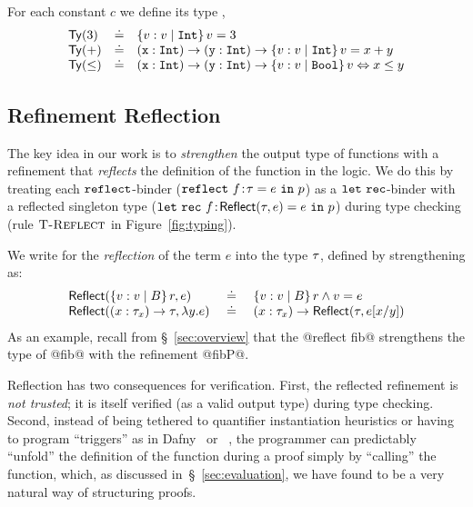 For each constant $c$ we define its type , \eg%
%
$$
\begin{array}{lcl}
\constty{3} &\doteq& \tref{v}{\tint}{v = 3}\\
\constty{+} &\doteq& \tfun{\ttx}{\tint}{\tfun{\tty}{\tint}{\tref{v}{\tint}{v = x + y}}}\\
\constty{\leq} &\doteq& \tfun{\ttx}{\tint}{\tfun{\tty}{\tint}{\tref{v}{\tbool}{v \Leftrightarrow x \leq y}}}\\
\end{array}
$$
%

\subsection{Refinement Reflection}\label{subsec:logicalannotations}
%
The key idea in our work is to
\emph{strengthen} the output type of functions
with a refinement that \emph{reflects} the
definition of the function in the logic.
%
We do this by treating each
%
$\erefname$-binder
%
(${\erefb{f}{\gtyp}{e}{\prog}}$)
%
as a $\eletname$-binder with a reflected singleton type
%
(${\eletb{f}{\exacttype{\gtyp}{e}}{e}{\prog}}$)
%
during type checking (rule $\rtreflect$ in Figure~\ref{fig:typing}).

%
We write  for the \emph{reflection}
of the term $e$ into the type $\typ$,  defined by strengthening
\typ as:
%
$$
\begin{array}{lcl}
\exacttype{\tref{v}{\btyp}{r}}{e}
  & \defeq
  & \tref{v}{\btyp}{r \land v = e}\\
\exacttype{\tfun{x}{\typ_x}{\typ}}{\efun{y}{}{e}}
  & \defeq
  & \tfun{x}{\typ_x}{\exacttype{\typ}{e\subst{y}{x}}}
\end{array}
$$
%
As an example, recall from \S~\ref{sec:overview}
that the @reflect fib@ strengthens the type of
@fib@ with the refinement @fibP@.


%
Reflection has two consequences for verification.
%
First, the reflected refinement is \emph{not trusted};
it is itself verified (as a valid output type)
during type checking.
%
Second, instead of being tethered to quantifier
instantiation heuristics or having to program
``triggers'' as in Dafny~\citep{dafny} or
\fstar~\citep{fstar},
%
the programmer can predictably ``unfold'' the
definition of the function during a proof simply
by ``calling'' the function, which, as discussed
in~\S~\ref{sec:evaluation}, we have found to be
a very natural way of structuring proofs.


